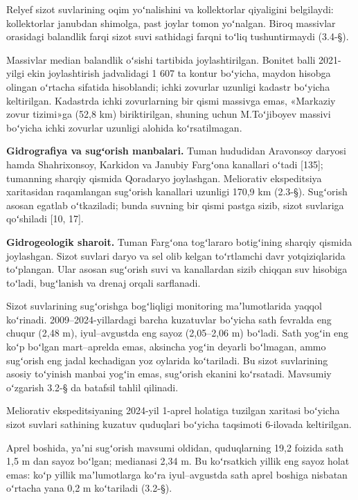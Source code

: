 \documentclass[14pt,a4paper,oneside]{extreport}
\begin{document}
Relyef sizot suvlarining oqim yoʻnalishini va kollektorlar qiyaligini
belgilaydi: kollektorlar janubdan shimolga, past joylar tomon yoʻnalgan.
Biroq massivlar orasidagi balandlik farqi sizot suvi sathidagi farqni
toʻliq tushuntirmaydi (3.4-§).

Massivlar median balandlik oʻsishi tartibida joylashtirilgan. Bonitet
balli 2021-yilgi ekin joylashtirish jadvalidagi 1 607 ta kontur
boʻyicha, maydon hisobga olingan oʻrtacha sifatida hisoblandi; ichki
zovurlar uzunligi kadastr boʻyicha keltirilgan. Kadastrda ichki
zovurlarning bir qismi massivga emas, «Markaziy zovur tizimi»ga (52,8
km) biriktirilgan, shuning uchun M.Toʻjiboyev massivi boʻyicha ichki
zovurlar uzunligi alohida koʻrsatilmagan.

\textbf{Gidrografiya va sugʻorish manbalari.} Tuman hududidan Aravonsoy
daryosi hamda Shahrixonsoy, Karkidon va Janubiy Fargʻona kanallari
oʻtadi {[}135{]}; tumanning sharqiy qismida Qoradaryo joylashgan.
Meliorativ ekspeditsiya xaritasidan raqamlangan sugʻorish kanallari
uzunligi 170,9 km (2.3-§). Sugʻorish asosan egatlab oʻtkaziladi; bunda
suvning bir qismi pastga sizib, sizot suvlariga qoʻshiladi {[}10, 17{]}.

\textbf{Gidrogeologik sharoit.} Tuman Fargʻona togʻlararo botigʻining
sharqiy qismida joylashgan. Sizot suvlari daryo va sel olib kelgan
toʻrtlamchi davr yotqiziqlarida toʻplangan. Ular asosan sugʻorish suvi
va kanallardan sizib chiqqan suv hisobiga toʻladi, bugʻlanish va drenaj
orqali sarflanadi.

Sizot suvlarining sugʻorishga bogʻliqligi monitoring maʼlumotlarida
yaqqol koʻrinadi. 2009--2024-yillardagi barcha kuzatuvlar boʻyicha sath
fevralda eng chuqur (2,48 m), iyul--avgustda eng sayoz (2,05--2,06 m)
boʻladi. Sath yogʻin eng koʻp boʻlgan mart--aprelda emas, aksincha
yogʻin deyarli boʻlmagan, ammo sugʻorish eng jadal kechadigan yoz
oylarida koʻtariladi. Bu sizot suvlarining asosiy toʻyinish manbai
yogʻin emas, sugʻorish ekanini koʻrsatadi. Mavsumiy oʻzgarish 3.2-§ da
batafsil tahlil qilinadi.

Meliorativ ekspeditsiyaning 2024-yil 1-aprel holatiga tuzilgan xaritasi
boʻyicha sizot suvlari sathining kuzatuv quduqlari boʻyicha taqsimoti
6-ilovada keltirilgan.

Aprel boshida, yaʼni sugʻorish mavsumi oldidan, quduqlarning 19,2
foizida sath 1,5 m dan sayoz boʻlgan; medianasi 2,34 m. Bu koʻrsatkich
yillik eng sayoz holat emas: koʻp yillik maʼlumotlarga koʻra
iyul--avgustda sath aprel boshiga nisbatan oʻrtacha yana 0,2 m
koʻtariladi (3.2-§).
\end{document}

